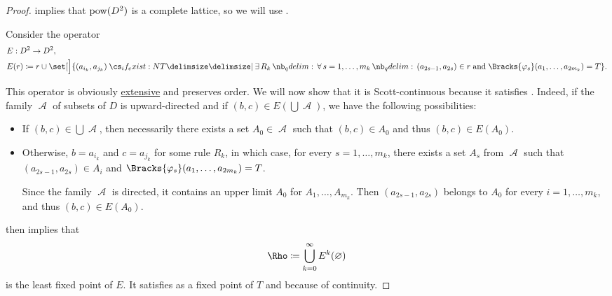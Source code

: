 \begin{proof}
   implies that \( \operatorname{pow}(D^2) \) is a complete lattice, so we will use .

  Consider the operator
  \begin{equation*}
    \begin{aligned}
      &E: D^2 \to D^2, \\
      &E(r) \coloneqq r \cup \set[\Big]{ (a_{i_k}, a_{j_k}) \given* \qexists* {R_k} \qforall* {s = 1, \ldots, m_k} (a_{2s - 1}, a_{2s}) \in r \T{and} \Bracks{\varphi_s}(a_1, \ldots, a_{2m_k}) = T }.
    \end{aligned}
  \end{equation*}

  This operator is obviously \hyperref[def:extensive_function]{extensive} and preserves order. We will now show that it is Scott-continuous because it satisfies . Indeed, if the family \( \mscrA \) of subsets of \( D \) is upward-directed and if \( (b, c) \in E(\bigcup \mscrA) \), we have the following possibilities:
  \begin{itemize}
    \item If \( (b, c) \in \bigcup \mscrA \), then necessarily there exists a set \( A_0 \in \mscrA \) such that \( (b, c) \in A_0 \) and thus \( (b, c) \in E(A_0) \).

    \item Otherwise, \( b = a_{i_k} \) and \( c = a_{j_k} \) for some rule \( R_k \), in which case, for every \( s = 1, \ldots, m_k \), there exists a set \( A_s \) from \( \mscrA \) such that \( (a_{2s - 1}, a_{2s}) \in A_i \) and \( \Bracks{\varphi_s}(a_1, \ldots, a_{2m_k}) = T \).

    Since the family \( \mscrA \) is directed, it contains an upper limit \( A_0 \) for \( A_1, \ldots, A_{m_k} \). Then \( (a_{2s-1}, a_{2s})\) belongs to \( A_0 \) for every \( i = 1, \ldots, m_k \), and thus \( (b, c) \in E(A_0) \).
  \end{itemize}

   then implies that
  \begin{equation*}
    \Rho \coloneqq \bigcup_{k=0}^\infty E^k(\varnothing)
  \end{equation*}
  is the least fixed point of \( E \). It satisfies  as a fixed point of \( T \) and  because of continuity.
\end{proof}

